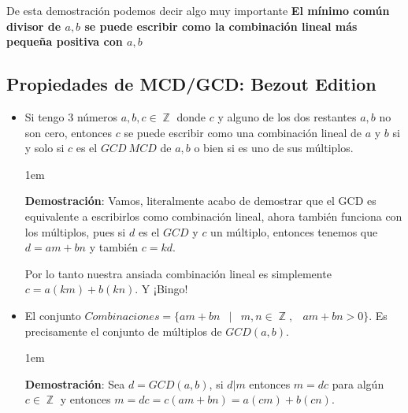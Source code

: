 \documentclass[12pt, fleqn]{report}                             %
\newenvironment{SmallIndentation}[1][0.75em]                    %
    {\begin{adjustwidth}{#1}{}\begin{footnotesize}}                 %
    {\end{footnotesize}\end{adjustwidth}}                           %
\DeclareMathOperator \Space {\quad}                             %
\DeclareMathOperator \MiniSpace {\;}                            %
\newcommand \Such {\MiniSpace|\MiniSpace}                       %
\DeclareMathOperator \Integers  {\mathbb{Z}}                     %
\begin{document}
            De esta demostración podemos decir algo muy importante \textbf{El mínimo común divisor de $a, b$
            se puede escribir como la combinación lineal más pequeña positiva con $a, b$}

        \clearpage
        \subsection{Propiedades de MCD/GCD: Bezout Edition}
            \begin{itemize}

                \item Si tengo 3 números $a, b, c \in \Integers$ donde $c$ y alguno de los
                dos restantes $a,b$ no son cero, entonces $c$ se puede escribir como
                una combinación lineal de $a$ y $b$ si y solo si $c$ es el $GCD \ MCD$ de
                $a, b$ o bien si es uno de sus múltiplos.

                    \begin{SmallIndentation}[1em]
                        \textbf{Demostración}:
                            Vamos, literalmente acabo de demostrar que el GCD es equivalente
                            a escribirlos como combinación lineal, ahora también funciona con
                            los múltiplos, pues si $d$ es el $GCD$ y $c$ un múltiplo, entonces
                            tenemos que $d=am+bn$ y también $c=kd$.

                            Por lo tanto nuestra ansiada combinación lineal es simplemente
                            $c=a(km)+b(kn)$. Y ¡Bingo!

                    \end{SmallIndentation} 


                \item El conjunto 
                    $Combinaciones = \{ am+bn \Such m, n \in \Integers, \MiniSpace am+bn > 0 \}$.
                    Es precisamente el conjunto de múltiplos de $GCD(a,b)$.

                    \begin{SmallIndentation}[1em]
                        \textbf{Demostración}:
                            Sea $d=GCD(a,b)$, si $d|m$ entonces $m = dc$ para algún $c \in \Integers$
                            y entonces $m = dc = c(am+bn)=a(cm)+b(cn)$.


\end{SmallIndentation}
\end{itemize}
\end{document}

